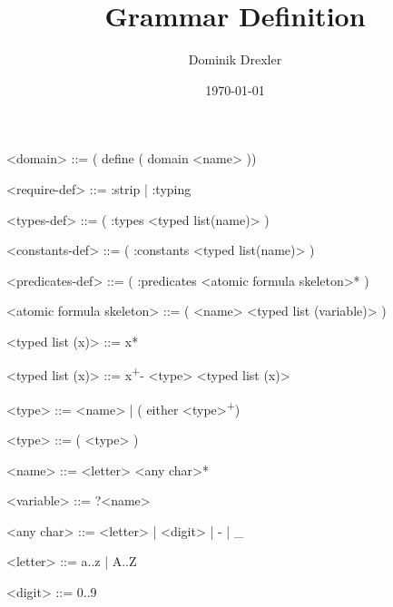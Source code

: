 \documentclass[]{article}
\title{Grammar Definition}
\author{Dominik Drexler}
\date{\today}
\begin{document}
\maketitle

\begin{grammar}
    \newcommand{\plus}{\textsuperscript{+}}
    \newcommand{\typing}{\textsuperscript{:typing~}}
    \newcommand{\fluents}{\textsuperscript{:fluents~}}

    <domain> ::= ( define ( domain <name> )    )

    <require-def> ::= :strip | :typing

    <types-def> ::= ( :types <typed list(name)> )

    <constants-def> ::= ( :constants <typed list(name)> )

    <predicates-def> ::= ( :predicates <atomic formula skeleton>* )

    <atomic formula skeleton> ::= ( <name> <typed list (variable)> )

    <typed list (x)> ::= x*

    <typed list (x)> ::= x\plus - <type> <typed list (x)>

    <type> ::= <name> | ( either <type>\plus )

    <type> ::= ( <type> )

    <name> ::= <letter> <any char>*

    <variable> ::= ?<name>

    <any char> ::= <letter> | <digit> | - | _

    <letter> ::= a..z | A..Z

    <digit> ::= 0..9

\end{grammar}

\nocite{mcdermott-et-al-1998}



\end{document}
